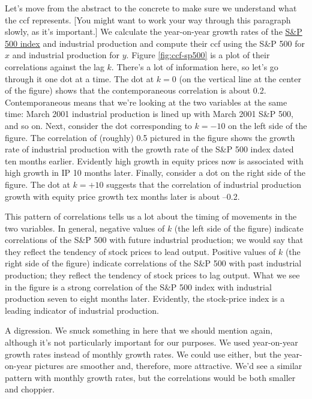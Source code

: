 Let's move from the abstract to the concrete to make sure we
understand what the ccf represents.
[You might want to work your way through this paragraph slowly,
as it's important.]
We calculate the year-on-year growth rates of the \href{http://research.stlouisfed.org/fred2/series/SP500}{S\&P 500 index}
and industrial production and compute their ccf using
the S\&P 500 for $x$ and industrial production for $y$.
Figure \ref{fig:ccf-sp500} is a plot of their correlations against
the lag $k$.
There's a lot of information here, so let's go through it
one dot at a time.
The dot at $k=0$ (on the vertical line at the center of the figure)
shows that the contemporaneous correlation is about 0.2.
Contemporaneous means that we're looking at the two variables
at the same time:
March 2001 industrial production is lined up with March 2001 S\&P 500,
and so on.
Next, consider the dot corresponding to $ k = -10$ on the left
side of the figure.
The correlation of (roughly) 0.5 pictured in the figure
shows the growth rate of industrial production with
the growth rate of the S\&P 500 index dated
ten months earlier.
Evidently high growth in equity prices now
is associated with high growth in IP 10 months later.
Finally, consider a dot on the right side of the figure.
The dot at $k=+10$ suggests that the correlation
of industrial production growth with equity price growth tex months
later is about --0.2.

This pattern of correlations tells us a lot about the
timing of movements in the two variables.
In general, negative values of $k$ (the left side of the figure)
indicate correlations of the S\&P 500 with
future industrial production; we would say that they reflect the tendency
of stock prices to lead output.
Positive values of $k$ (the right side of the figure)
indicate correlations of the S\&P 500 with
past industrial production; they reflect
the tendency of stock prices to lag output.
What we see in the figure is a strong correlation of the S\&P 500 index
with industrial production seven to eight months later.
Evidently, the stock-price index is a leading indicator of
industrial production.

A digression.  We snuck something in here that we
should mention again,
although it's not particularly important for our purposes.
We used year-on-year growth rates instead of monthly
growth rates.
We could use either, but the year-on-year pictures are smoother
and, therefore, more attractive.
We'd see a similar pattern with monthly growth rates, but the correlations would be both smaller and choppier.



